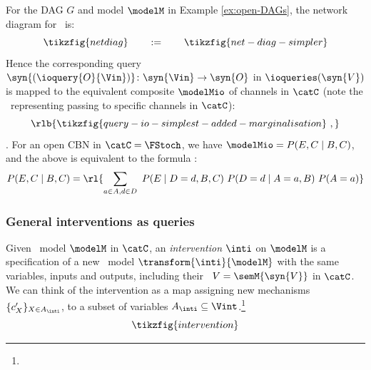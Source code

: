 \documentclass{article}
\begin{document}
\begin{example}
For the DAG $G$ and model $\modelM$ in Example \ref{ex:open-DAGs}, the network diagram 
for \ is: 
\[
\tikzfig{netdiag} 
\qquad  := \qquad 
\tikzfig{net-diag-simpler}
\]
Hence the corresponding query $\syn{(\ioquery{O}{\Vin})} \colon \syn{\Vin} \to \syn{O}$ in $\ioqueries(\syn{V})$ 
is mapped to the equivalent composite $\modelMio$ of channels in $\catC$ (note the \ representing passing to specific channels in $\catC$): 
\[
\rlb{\tikzfig{query-io-simplest-added-marginalisation} \ ,}
\]
. 
For an open CBN in $\catC=\FStoch$, we have $\modelMio =  P(E,C \mid B ,C)$, and the above is equivalent to the formula : 
\[
P(E, C \mid B, C) = \rl{\sum_{a\in A,d\in D} \ P(E \mid D=d,B,C) \ P(D=d \mid A=a,B) \ P(A=a)}
\]
\end{example}


\subsubsection{General interventions as queries} \label{subsub:general-int}

Given \ model $\modelM$ in $\catC$, an \emph{intervention} $\inti$ on $\modelM$ is a specification of a new \ model $\transform{\inti}{\modelM}$ with the same variables, inputs and outputs, including their \ $V = \semM{\syn{V}}$ in $\catC$. We can think of the intervention as a map 
assigning new mechanisms $\{c'_{X}\}_{X \in A_{\inti}}$, to a subset of variables \st{$A_{\inti} \subseteq \Vint$}.\footnote{} 
\begin{equation} \label{eq:intervention}
\tikzfig{intervention}
\end{equation}
\end{document}
